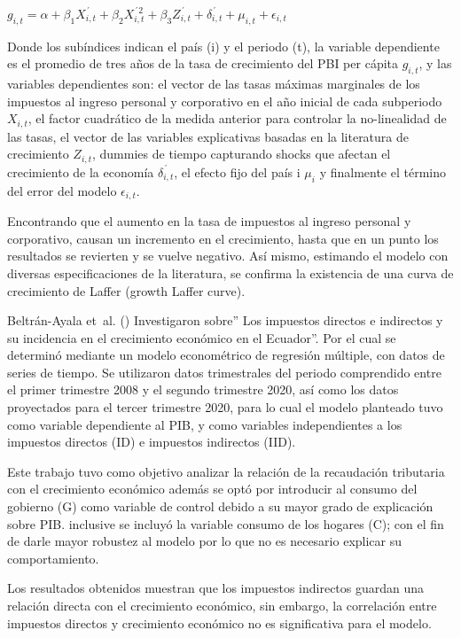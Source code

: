 \documentclass[
  jou,
  floatsintext,
  longtable,
  a4paper,
  nolmodern,
  notxfonts,
  notimes,
  12pt,
  colorlinks=true,linkcolor=blue,citecolor=blue,urlcolor=blue]{apa7}
\begin{document}
\(g_{i, t} = \alpha + \beta_{1}X_{i, t}^{´} + \beta_{2}X_{i, t}^{´2} + \beta_{3}Z_{i, t}^{´} + \delta_{i, t}^{´} + \mu_{i, t} + \epsilon_{i, t}\)

Donde los subíndices indican el país (i) y el periodo (t), la variable
dependiente es el promedio de tres años de la tasa de crecimiento del
PBI per cápita \(g_{i, t}\), y las variables dependientes son: el vector
de las tasas máximas marginales de los impuestos al ingreso personal y
corporativo en el año inicial de cada subperiodo \(X_{i, t}\), el factor
cuadrático de la medida anterior para controlar la no-linealidad de las
tasas, el vector de las variables explicativas basadas en la literatura
de crecimiento \(Z_{i, t}\), dummies de tiempo capturando shocks que
afectan el crecimiento de la economía \(\delta_{i, t}^{´}\), el efecto
fijo del país i \(\mu_{i}\) y finalmente el término del error del modelo
\(\epsilon_{i, t}\).

Encontrando que el aumento en la tasa de impuestos al ingreso personal y
corporativo, causan un incremento en el crecimiento, hasta que en un
punto los resultados se revierten y se vuelve negativo. Así mismo,
estimando el modelo con diversas especificaciones de la literatura, se
confirma la existencia de una curva de crecimiento de Laffer (growth
Laffer curve).

Beltrán-Ayala et~al. ()
Investigaron sobre'' Los impuestos directos e indirectos y su incidencia
en el crecimiento económico en el Ecuador''. Por el cual se determinó
mediante un modelo econométrico de regresión múltiple, con datos de
series de tiempo. Se utilizaron datos trimestrales del periodo
comprendido entre el primer trimestre 2008 y el segundo trimestre 2020,
así como los datos proyectados para el tercer trimestre 2020, para lo
cual el modelo planteado tuvo como variable dependiente al PIB, y como
variables independientes a los impuestos directos (ID) e impuestos
indirectos (IID).

Este trabajo tuvo como objetivo analizar la relación de la recaudación
tributaria con el crecimiento económico además se optó por introducir al
consumo del gobierno (G) como variable de control debido a su mayor
grado de explicación sobre PIB. inclusive se incluyó la variable consumo
de los hogares (C); con el fin de darle mayor robustez al modelo por lo
que no es necesario explicar su comportamiento.

Los resultados obtenidos muestran que los impuestos indirectos guardan
una relación directa con el crecimiento económico, sin embargo, la
correlación entre impuestos directos y crecimiento económico no es
significativa para el modelo.
\end{document}
